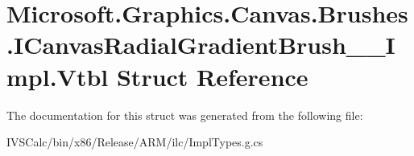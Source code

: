 \hypertarget{struct_microsoft_1_1_graphics_1_1_canvas_1_1_brushes_1_1_i_canvas_radial_gradient_brush_____impl_1_1_vtbl}{}\section{Microsoft.\+Graphics.\+Canvas.\+Brushes.\+I\+Canvas\+Radial\+Gradient\+Brush\+\_\+\+\_\+\+Impl.\+Vtbl Struct Reference}
\label{struct_microsoft_1_1_graphics_1_1_canvas_1_1_brushes_1_1_i_canvas_radial_gradient_brush_____impl_1_1_vtbl}


The documentation for this struct was generated from the following file\+:\begin{DoxyCompactItemize}
\item 
I\+V\+S\+Calc/bin/x86/\+Release/\+A\+R\+M/ilc/Impl\+Types.\+g.\+cs\end{DoxyCompactItemize}
